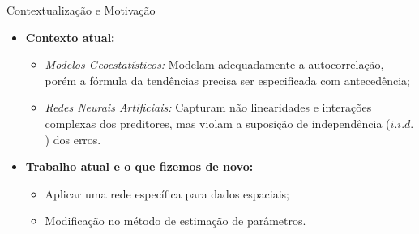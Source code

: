 \documentclass{beamer}
\begin{document}


    \begin{frame}{Contextualização e Motivação}
        \begin{itemize}
            \item \textbf{Contexto atual:}
            \begin{itemize}
                \item \emph{Modelos Geoestatísticos:} Modelam adequadamente a autocorrelação, porém a fórmula da tendências precisa ser especificada com antecedência;
                \item \emph{Redes Neurais Artificiais:} Capturam não linearidades e interações complexas dos preditores, mas violam a suposição de independência ($i.i.d.$) dos erros.
            \end{itemize}
            \item \textbf{Trabalho atual e o que fizemos de novo:} 
            \begin{itemize}
                \item Aplicar uma rede específica para dados espaciais;
                \item Modificação no método de estimação de parâmetros.
            \end{itemize}
        \end{itemize}
    \end{frame}
\end{document}
